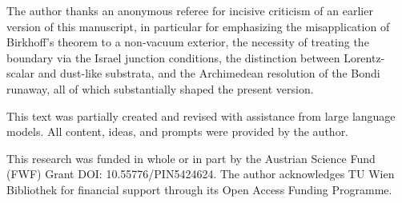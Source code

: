\documentclass[%
  reprint,
  superscriptaddress,
  showpacs,
  showkeys,
  amsmath,amssymb,
  pra,
  longbibliography,
  floatfix,
  x11names
]{revtex4-2}
\begin{document}
\begin{acknowledgments}
The author thanks an anonymous referee for incisive criticism of an earlier version of this manuscript, in particular for emphasizing the misapplication of Birkhoff's theorem to a non-vacuum exterior, the necessity of treating the boundary via the Israel junction conditions, the distinction between Lorentz-scalar and dust-like substrata, and the Archimedean resolution of the Bondi runaway, all of which substantially shaped the present version.

This text was partially created and revised with assistance from large language models. All content, ideas, and prompts were provided by the author.

This research was funded in whole or in part by the Austrian Science Fund (FWF) Grant DOI: 10.55776/PIN5424624. The author acknowledges TU Wien Bibliothek for financial support through its Open Access Funding Programme.
\end{acknowledgments}


\end{document}
